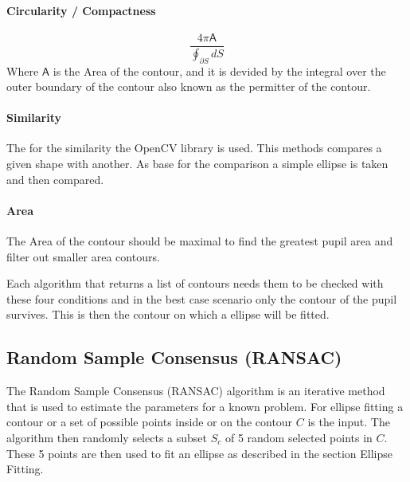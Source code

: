    \paragraph{Circularity / Compactness}
    \begin{equation}
        \frac{4\pi\mathsf{A} }{\oint_{\partial S} dS}
    \end{equation}
    Where $\mathsf{A} $ is the Area of the contour, and it is devided by the integral over the outer boundary of the contour also known as the permitter of the contour.

    \paragraph{Similarity }
    The for the similarity the OpenCV library is used. This methods compares a given shape with another. As base for the comparison a simple ellipse is taken and then compared.

    \paragraph{Area}
    The Area of the contour should be maximal to find the greatest pupil area and filter out smaller area contours. 

   Each algorithm that returns a list of contours needs them to be checked with these four conditions and in the best case scenario only the contour of the pupil survives. This is then the contour on which a ellipse will be fitted. 


\subsection{Random Sample Consensus (RANSAC)}
The Random Sample Consensus (RANSAC) algorithm is an iterative method that is used to estimate the parameters for a known problem. For ellipse fitting a contour or a set of possible points inside or on the contour $C$ is the input. The algorithm then randomly selects a subset $S_c$ of 5 random selected points in $C$. 
These 5 points are then used to fit an ellipse as described in the section Ellipse Fitting.

